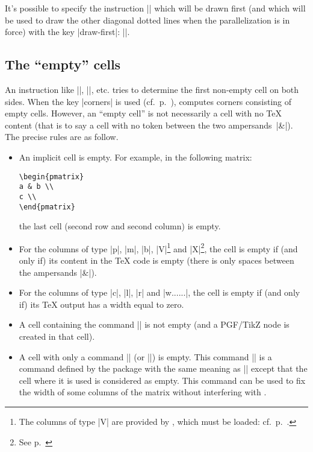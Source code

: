 \documentclass[dvipsnames]{article}%
\begin{document}
It's possible to specify the instruction |\Ddots| which will be drawn first
(and which will be used to draw the other diagonal dotted lines when the
parallelization is in force) with the key |draw-first|: ||.

\subsection[The empty cells]{The ``empty'' cells}

\label{empty-cells}
An instruction like |\Ldots|, |\Cdots|, etc. tries to determine the first
non-empty cell on both sides. When the key |corners| is used
(cf.~p.~\pageref{corners}),  computes corners consisting of
empty cells. However, an ``empty cell'' is not necessarily a cell with no TeX
content (that is to say a cell with no token between the two ampersands~|&|).
The precise rules are as follow.

\begin{itemize}
\item An implicit cell is empty. For example, in the following matrix:

\begin{Verbatim}
\begin{pmatrix}
a & b \\
c \\
\end{pmatrix}
\end{Verbatim}

the last cell (second row and second column) is empty.

\medskip
\item For the columns of type |p|, |m|, |b|, |V|\footnote{The columns of type
  |V| are provided by , which must be loaded:
  cf.~p.~\pageref{varwidth}.} and |X|\footnote{See p.~\pageref{X-columns}}, the
cell is empty if (and only if) its content in the TeX code is empty (there is
only spaces between the ampersands |&|).

\medskip
\item For the columns of type |c|, |l|, |r| and |w{...}{...}|, the cell is
empty if (and only if) its TeX output has a width equal to zero.

\medskip
\item {}
A cell containing the command |\NotEmpty| is not empty (and a PGF/TikZ
node is created in that cell).

\medskip
\item A cell with only a command |\Hspace| (or |\Hspace*|) is empty. This
command |\Hspace| is a command defined by the package  with
the same meaning as |\hspace| except that the cell where it is used is
considered as empty. This command can be used to fix the width of some columns
of the matrix without interfering with .
\end{itemize}
\end{document}
